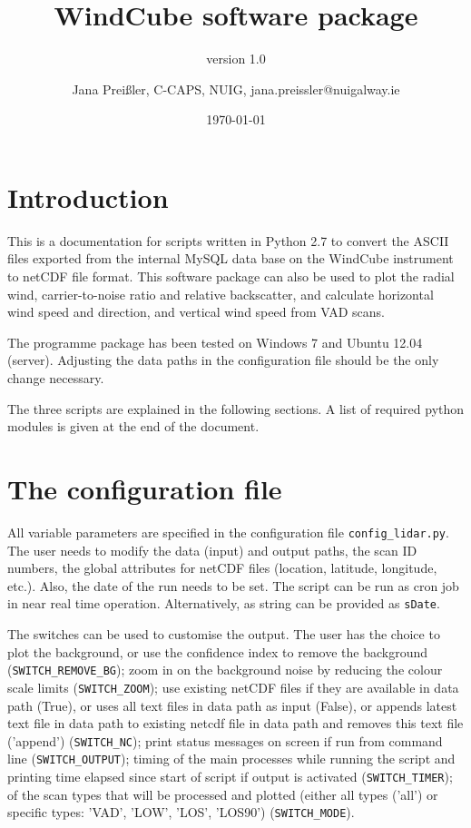 \documentclass[a4paper]{scrartcl}
\title{WindCube software package}
\subtitle{version 1.0}
\author{Jana Prei{\ss}ler, C-CAPS, NUIG, jana.preissler@nuigalway.ie}
\date{\today}
\begin{document}
	\maketitle

\section{Introduction}
This is a documentation for scripts written in Python 2.7 to convert the ASCII files exported from the internal MySQL data base on the WindCube instrument to netCDF file format. This software package can also be used to plot the radial wind, carrier-to-noise ratio and relative backscatter, and calculate horizontal wind speed and direction, and vertical wind speed from VAD scans.

The programme package has been tested on Windows 7 and Ubuntu 12.04 (server). Adjusting the data paths in the configuration file should be the only change necessary.

The three scripts are explained in the following sections. A list of required python modules is given at the end of the document.


\section{The configuration file}
All variable parameters are specified in the configuration file \verb/config_lidar.py/. The user needs to modify the data (input) and output paths, the scan ID numbers, the global attributes for netCDF files (location, latitude, longitude, etc.). Also, the date of the run needs to be set. The script can be run as cron job in near real time operation. Alternatively, as string can be provided as \verb/sDate/.

The switches can be used to customise the output. The user has the choice to plot the background, or use the confidence index to remove the background (\verb/SWITCH_REMOVE_BG/); zoom in on the background noise by reducing the colour scale limits (\verb/SWITCH_ZOOM/); use existing netCDF files if they are available in data path (True), or uses all text files in data path as input (False), or appends latest text file in data path to existing netcdf file in data path and removes this text file ('append') (\verb/SWITCH_NC/); print status messages on screen if run from command line (\verb/SWITCH_OUTPUT/); timing of the main processes while running the script and printing time elapsed since start of script if output is activated (\verb/SWITCH_TIMER/); of the scan types that will be processed and plotted (either all types ('all') or specific types: 'VAD', 'LOW', 'LOS', 'LOS90') (\verb/SWITCH_MODE/).
\end{document}
